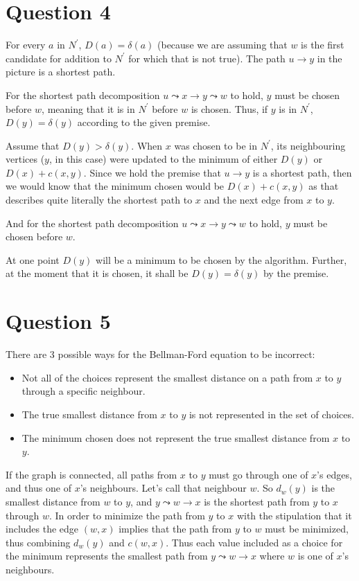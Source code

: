 \documentclass[12pt]{article}
\begin{document}
\section*{Question 4}
For every $a$ in $N^\prime$, $D(a) = \delta(a)$ (because we are assuming that $w$ is the first candidate for addition to $N^\prime$ for which that is not true). The path $u \to y$ in the picture is a shortest path.

For the shortest path decomposition $u \leadsto x \to y \leadsto w$ to hold, $y$ must be chosen before $w$, meaning that it is in $N^\prime$ before $w$ is chosen. Thus, if $y$ is in $N^\prime$, $D(y) = \delta(y)$ according to the given premise.

Assume that $D(y) > \delta(y)$. When $x$ was chosen to be in $N^\prime$, its neighbouring vertices ($y$, in this case) were updated to the minimum of either $D(y)$ or $D(x) + c(x, y)$. Since we hold the premise that $u \to y$ is a shortest path, then we would know that the minimum chosen would be $D(x) + c(x, y)$ as that describes quite literally the shortest path to $x$ and the next edge from $x$ to $y$.

And for the shortest path decomposition $u \leadsto x \to y \leadsto w$ to hold, $y$ must be chosen before $w$.

At one point $D(y)$ will be a minimum to be chosen by the algorithm. Further, at the moment that it is chosen, it shall be $D(y) = \delta(y)$ by the premise.

\section*{Question 5}
There are 3 possible ways for the Bellman-Ford equation to be incorrect:
\begin{itemize}
\item Not all of the choices represent the smallest distance on a path from $x$ to $y$ through a specific neighbour.
\item The true smallest distance from $x$ to $y$ is not represented in the set of choices.
\item The minimum chosen does not represent the true smallest distance from $x$ to $y$.
\end{itemize}

If the graph is connected, all paths from $x$ to $y$ must go through one of $x$’s edges, and thus one of $x$’s neighbours. Let’s call that neighbour $w$. So $d_w(y)$ is the smallest distance from $w$ to $y$, and $y \leadsto w \to x$ is the shortest path from $y$ to $x$ through $w$. In order to minimize the path from $y$ to $x$ with the stipulation that it includes the edge $(w, x)$ implies that the path from $y$ to $w$ must be minimized, thus combining $d_w(y)$ and $c(w, x)$. Thus each value included as a choice for the minimum represents the smallest path from $y \leadsto w \to x$ where $w$ is one of $x$’s neighbours.
\end{document}
